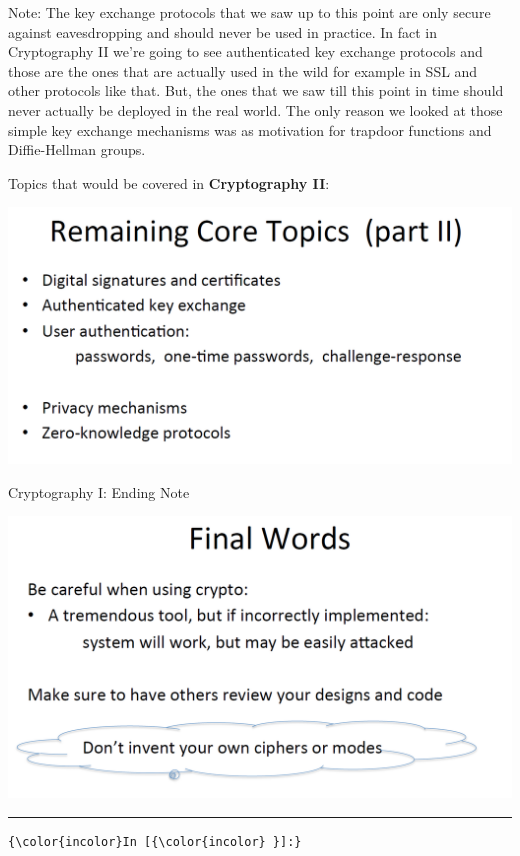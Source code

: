 \documentclass[11pt]{article}
\makeatletter
\def\maxwidth{\ifdim\Gin@nat@width>\linewidth\linewidth
    \else\Gin@nat@width\fi}
\let\Oldincludegraphics\includegraphics
\renewcommand{\includegraphics}[1]{\Oldincludegraphics[width=.8\maxwidth]{#1}}
\makeatother
\begin{document}
Note: The key exchange protocols that we saw up to this point are only
secure against eavesdropping and should never be used in practice. In
fact in Cryptography II we're going to see authenticated key exchange
protocols and those are the ones that are actually used in the wild for
example in SSL and other protocols like that. But, the ones that we saw
till this point in time should never actually be deployed in the real
world. The only reason we looked at those simple key exchange mechanisms
was as motivation for trapdoor functions and Diffie-Hellman groups.

Topics that would be covered in \textbf{Cryptography II}:

\includegraphics{./Images/Remaining.png}

Cryptography I: Ending Note

\includegraphics{./Images/FinalWords.png}

\begin{center}\rule{0.5\linewidth}{\linethickness}\end{center}

    \begin{Verbatim}[commandchars=\\\{\}]
{\color{incolor}In [{\color{incolor} }]:} 
\end{Verbatim}


    
    
    
    
\end{document}
